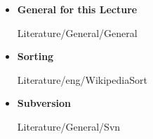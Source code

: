 \begin{frame}{\LectureFurtherLiterature}
  \begin{itemize}
    \item
    \textbf{General for this Lecture}
    \begin{btSect}{Literature/General/General}
      \btPrintAll
    \end{btSect}
  \end{itemize}
\end{frame}


\begin{frame}{\LectureFurtherLiterature}
  \begin{itemize}
    \item
      \textbf{Sorting}
      \begin{btSect}{Literature/eng/WikipediaSort}
        \btPrintAll
      \end{btSect}
  \end{itemize}
\end{frame}




\begin{frame}{\LectureFurtherLiterature}
  \begin{itemize}
    \item
    \textbf{Subversion}
    \begin{btSect}{Literature/General/Svn}
      \btPrintAll
    \end{btSect}
  \end{itemize}
\end{frame}